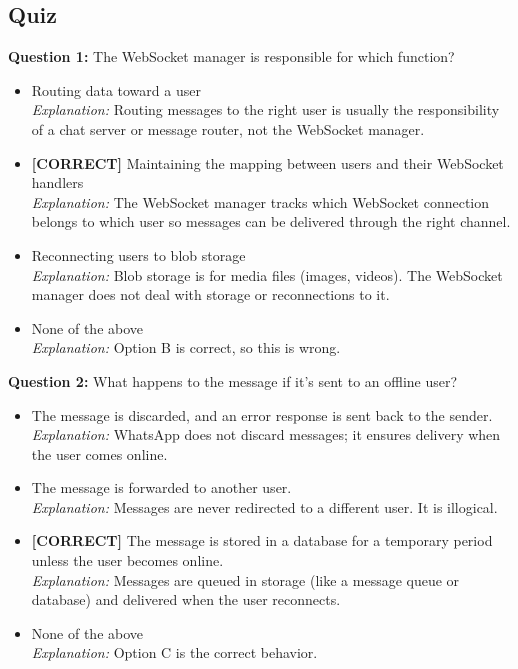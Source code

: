 

\subsection*{Quiz}
\vspace{0.3cm}
\noindent
\textbf{Question 1:} The WebSocket manager is responsible for which function?
\\[0.2cm]
\begin{itemize}
 \item Routing data toward a user
\\[0.1cm]
\textit{Explanation:} 
Routing messages to the right user is usually the responsibility of a chat server or message router, not the WebSocket manager.
 \item \textbf{[CORRECT]} Maintaining the mapping between users and their WebSocket handlers
\\[0.1cm]
\textit{Explanation:} 
The WebSocket manager tracks which WebSocket connection belongs to which user so messages can be delivered through the right channel.
 \item Reconnecting users to blob storage
\\[0.1cm]
\textit{Explanation:} 
Blob storage is for media files (images, videos). The WebSocket manager does not deal with storage or reconnections to it.
 \item None of the above
\\[0.1cm]
\textit{Explanation:} 
Option B is correct, so this is wrong.
\end{itemize}
\vspace{0.3cm}
\noindent
\textbf{Question 2:} What happens to the message if it's sent to an offline user?
\\[0.2cm]
\begin{itemize}
 \item The message is discarded, and an error response is sent back to the sender.
\\[0.1cm]
\textit{Explanation:} 
WhatsApp does not discard messages; it ensures delivery when the user comes online.
 \item The message is forwarded to another user.
\\[0.1cm]
\textit{Explanation:} 
Messages are never redirected to a different user. It is illogical.
 \item \textbf{[CORRECT]} The message is stored in a database for a temporary period unless the user becomes online.
\\[0.1cm]
\textit{Explanation:} 
Messages are queued in storage (like a message queue or database) and delivered when the user reconnects.
 \item None of the above
\\[0.1cm]
\textit{Explanation:} 
Option C is the correct behavior.
\end{itemize}
